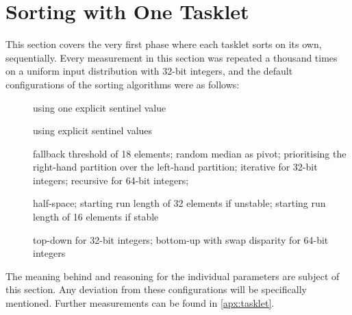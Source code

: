 \section{Sorting with One Tasklet}
\label{sec:tasklet}

This section covers the very first phase where each tasklet sorts on its own, \ie{} sequentially.
Every measurement in this section was repeated a thousand times on a uniform input distribution with 32-bit integers, and the default configurations of the sorting algorithms were as follows:
\begin{description}
	\item[\IS{}]
	using one explicit sentinel value

	\item[\ShS{}]
	using explicit sentinel values

	\item[\QS{}]
	fallback threshold of 18 elements;
	random median as pivot;
	prioritising the right-hand partition over the left-hand partition;
	iterative for 32-bit integers;
	recursive for 64-bit integers;

	\item[\MS{}]
	half-space;
	starting run length of 32 elements if unstable;
	starting run length of 16 elements if stable

	\item[\HS{}]
	top-down for 32-bit integers;
	bottom-up with swap disparity for 64-bit integers
\end{description}
The meaning behind and reasoning for the individual parameters are subject of this section.
Any deviation from these configurations will be specifically mentioned.
Further measurements can be found in \cref{apx:tasklet}.







